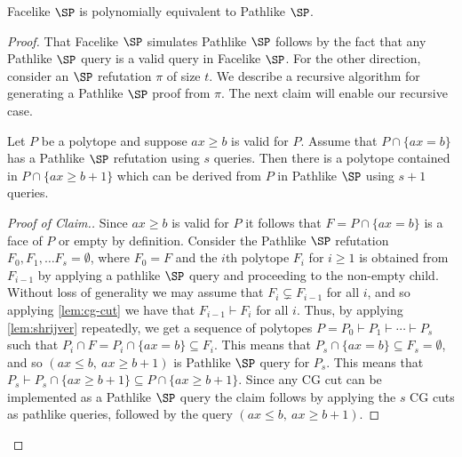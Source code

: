 	\begin{theorem}
	\label{lem:SPtopSP}
		Facelike $\SP$ is polynomially equivalent to Pathlike $\SP$.	
	\end{theorem}
	\begin{proof}
		That Facelike $\SP$ simulates Pathlike $\SP$ follows by the fact that any Pathlike $\SP$ query is a valid query in Facelike $\SP$.  
		For the other direction, consider an $\SP$ refutation $\pi$ of size $t$. 
		We describe a recursive algorithm for generating a Pathlike $\SP$ proof from $\pi$.
		The next claim will enable our recursive case.
	
	\begin{claim}Let $P$ be a polytope and suppose $ax \geq b$ is valid for $P$. 
	Assume that $P \cap \{ax = b\}$ has a Pathlike $\SP$ refutation using $s$ queries. 
	Then there is a polytope contained in $P \cap \{ax \geq b+1\}$ which can be derived from $P$ in Pathlike $\SP$ using $s+1$ queries. \end{claim}
	\begin{proof}[Proof of Claim.]
		Since $ax \geq b$ is valid for $P$ it follows that $F = P \cap \{ax = b\}$ is a face of $P$ or empty by definition.
		Consider the Pathlike $\SP$ refutation  $F_0, F_1, \ldots F_s = \emptyset$, where $F_0=F$ and the $i$th polytope $F_i$ for $i \geq 1$ is obtained from $F_{i-1}$ by applying a pathlike $\SP$ query and proceeding to the non-empty child.
		Without loss of generality we may assume that $F_i \subsetneq F_{i-1}$ for all $i$, and so applying \autoref{lem:cg-cut} we have that $F_{i-1} \vdash F_i$ for all $i$.
		Thus, by applying \autoref{lem:shrijver} repeatedly, we get a sequence of polytopes $P = P_0 \vdash P_1 \vdash \cdots \vdash P_s$ such that $P_i \cap F = P_i \cap \{ax = b\} \subseteq F_i$. 
		This means that $P_s \cap \{ax = b\} \subseteq F_s = \emptyset$, and so $(ax \leq b,~ ax \geq b+1)$ is Pathlike $\SP$ query for $P_s$. 
		This means that $P_s \vdash P_s \cap \{ax \geq b+1\} \subseteq P \cap \{ax \geq b+1\}$.
		Since any CG cut can be implemented as a Pathlike $\SP$ query the claim follows by applying the $s$ CG cuts as pathlike queries, followed by the query $(ax \leq b,~ ax \geq b+1)$.
	\end{proof}
	

\end{proof}
